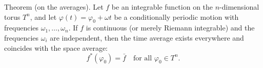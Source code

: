 Theorem (on the averages). Let $f$ be an integrable function on the $n$-dimensional torus $T^n$, and let $\varphi(t) = \varphi_0 + \omega t$ be a conditionally periodic motion with frequencies $\omega_1, \ldots, \omega_n$. If $f$ is continuous (or merely Riemann integrable) and the frequencies $\omega_i$ are independent, then the time average exists everywhere and coincides with the space average:
$$f^*(\varphi_0) = \bar{f} \quad \text{for all } \varphi_0 \in T^n.$$
